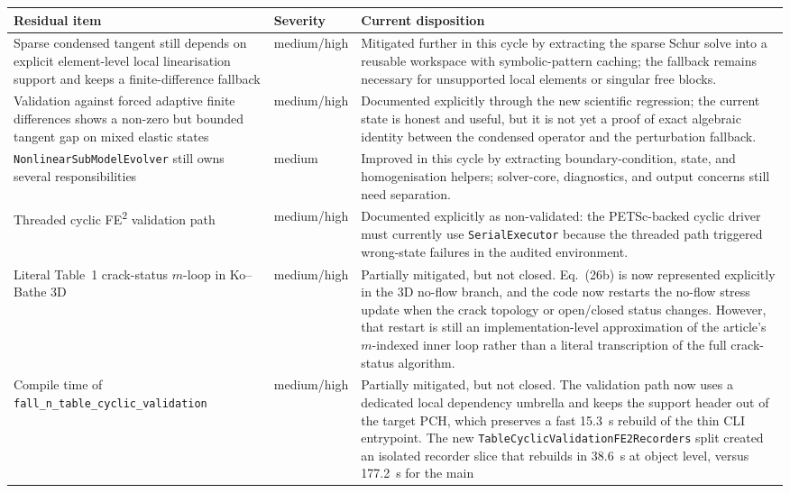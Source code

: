 \begin{table}[htb]
\centering
\small
\begin{tabular}{p{}p{}p{}}
\toprule
Residual item & Severity & Current disposition \\
\midrule
Sparse condensed tangent still depends on explicit element-level local
linearisation support and keeps a finite-difference fallback &
medium/high &
Mitigated further in this cycle by extracting the sparse Schur solve into a
reusable workspace with symbolic-pattern caching; the fallback remains
necessary for unsupported local elements or singular free blocks. \\
Validation against forced adaptive finite differences shows a non-zero but
bounded tangent gap on mixed elastic states &
medium/high &
Documented explicitly through the new scientific regression; the current state
is honest and useful, but it is not yet a proof of exact algebraic identity
between the condensed operator and the perturbation fallback. \\
\texttt{NonlinearSubModelEvolver} still owns several responsibilities &
medium &
Improved in this cycle by extracting boundary-condition, state, and
homogenisation helpers; solver-core, diagnostics, and output concerns still
need separation. \\
Threaded cyclic FE\textsuperscript{2} validation path &
medium/high &
Documented explicitly as non-validated: the PETSc-backed cyclic driver must
currently use \texttt{SerialExecutor} because the threaded path triggered
wrong-state failures in the audited environment. \\
Literal Table~1 crack-status \(m\)-loop in Ko--Bathe 3D &
medium/high &
Partially mitigated, but not closed.  Eq.~(26b) is now represented explicitly
in the 3D no-flow branch, and the code now restarts the no-flow stress update
when the crack topology or open/closed status changes.  However, that restart
is still an implementation-level approximation of the article's \(m\)-indexed
inner loop rather than a literal transcription of the full crack-status
algorithm. \\
Compile time of \texttt{fall\_n\_table\_cyclic\_validation} &
medium/high &
Partially mitigated, but not closed.  The validation path now uses a dedicated
local dependency umbrella and keeps the support header out of the target PCH,
which preserves a fast 15.3~s rebuild of the thin CLI entrypoint.  The new
\texttt{TableCyclicValidationFE2Recorders} split created an isolated recorder
slice that rebuilds in 38.6~s at object level, versus 177.2~s for the main

\end{tabular}
\end{table}
